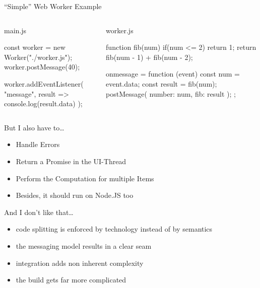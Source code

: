 \begin{frame}[fragile]{\enquote{Simple} Web Worker Example}
	\begin{columns}[t]
		\begin{column}{0.56\textwidth}
			\begin{block}{main.js}
				\begin{javascriptcode}
const worker = new Worker("./worker.js");
worker.postMessage(40);

worker.addEventListener(
	"message", 
	result => console.log(result.data)
);
				\end{javascriptcode}
			\end{block}
		\end{column}
		\pause
		\begin{column}{0.44\textwidth}
			\begin{block}{worker.js}
				\begin{javascriptcode}
function fib(num) {
	if(num <= 2) {
		return 1;
	}
	return fib(num - 1) + 
		fib(num - 2);
}

onmessage = function (event) {
	const num = event.data;
	const result = fib(num);
	postMessage({ 
		number: num, 
		fib: result 
	});
};	
				\end{javascriptcode}
			\end{block}
		\end{column}

	\end{columns}

\end{frame}

\begin{frame}{But I also have to\dots}
	\begin{itemize}
		\item Handle Errors 
		\item Return a Promise in the UI-Thread
		\item Perform the Computation for multiple Items
		\item Besides, it should run on Node.JS too
	\end{itemize}
\end{frame}

\begin{frame}{And I don't like that\dots}
	\begin{itemize}
		\item code splitting is enforced by technology instead of by semantics
		\item the messaging model results in a clear seam 
		\item integration adds non inherent complexity
		\item the build gets far more complicated
	\end{itemize}
\end{frame}
